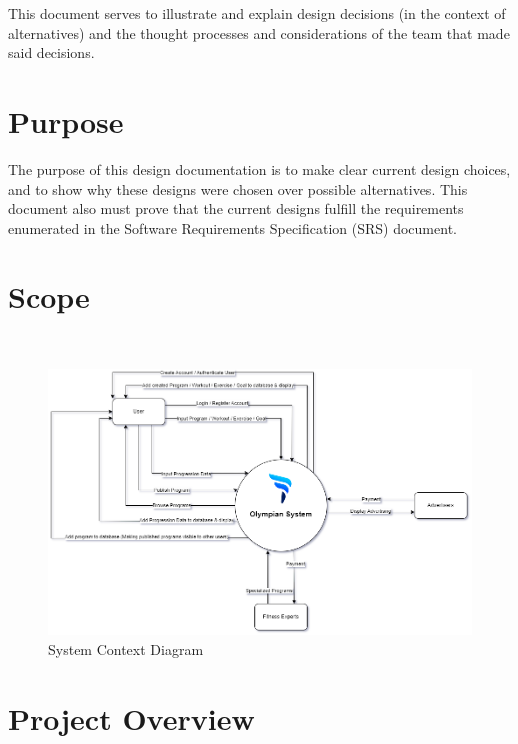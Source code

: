 \documentclass[12pt, titlepage]{article}
\begin{document}
	
	This document serves to illustrate and explain design decisions (in the context of alternatives) and the thought processes and considerations of the team that made said decisions.
	\section{Purpose}
	
	
	
	The purpose of this design documentation is to make clear current design choices, and to show why these designs were chosen over possible alternatives. This document also must prove that the current designs fulfill the requirements enumerated in the Software Requirements Specification (SRS) document.
	
	\section{Scope}
	
	\\
	
	\begin{figure}[H]
		\centering
		\includegraphics[scale=0.55]{system_context}
		\caption{System Context Diagram}
	\end{figure}

	\section{Project Overview}
	
\end{document}
